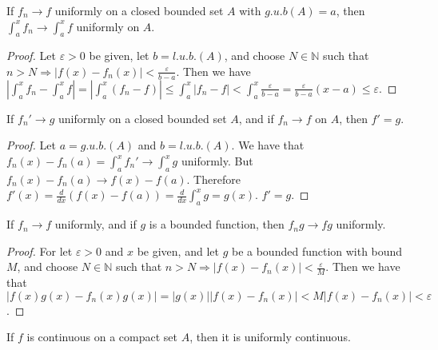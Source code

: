         \begin{theorem}
            If $f_n\rightarrow f$ uniformly on a closed bounded set $A$ with $g.u.b(A)=a$, then $\int_{a}^{x} f_n \rightarrow \int_{a}^{x} f$ uniformly on $A$.
        \end{theorem}
        \begin{proof}
            Let $\varepsilon >0$ be given, let $b=l.u.b.(A)$, and choose $N\in\mathbb{N}$ such that $n>N\Rightarrow |f(x)-f_n(x)|<\frac{\varepsilon}{b-a}$. Then we have $|\int_{a}^{x} f_n - \int_{a}^{x} f| = |\int_{a}^{x} (f_n-f)| \leq \int_{a}^{x} |f_n-f| < \int_{a}^{x} \frac{\varepsilon}{b-a}= \frac{\varepsilon}{b-a}(x-a) \leq \varepsilon$.
        \end{proof}
        \begin{theorem}
            If $f_n'\rightarrow g$ uniformly on a closed bounded set $A$, and if $f_n \rightarrow f$ on $A$, then $f'=g$.
        \end{theorem}
        \begin{proof}
            Let $a=g.u.b.(A)$ and $b=l.u.b.(A)$. We have that $f_n(x) - f_n(a) = \int_{a}^{x}f_n' \rightarrow \int_{a}^{x}g$ uniformly. But $f_n(x)-f_n(a) \rightarrow f(x) - f(a)$. Therefore $f'(x)=\frac{d}{dx}(f(x)-f(a)) = \frac{d}{dx}\int_{a}^{x} g = g(x)$. $f' = g$.
        \end{proof}
        \begin{theorem}
            If $f_n \rightarrow f$ uniformly, and if $g$ is a bounded function, then $f_n g \rightarrow fg$ uniformly.
        \end{theorem}
        \begin{proof}
            For let $\varepsilon>0$ and $x$ be given, and let $g$ be a bounded function with bound $M$, and choose $N\in\mathbb{N}$ such that $n>N \Rightarrow |f(x)-f_n(x)|<\frac{\varepsilon}{M}$. Then we have that $|f(x)g(x)-f_n(x)g(x)| = |g(x)||f(x)-f_n(x)| < M|f(x)-f_n(x)| <\varepsilon$.
        \end{proof}
        \begin{theorem}
            If $f$ is continuous on a compact set $A$, then it is uniformly continuous.
        \end{theorem}
